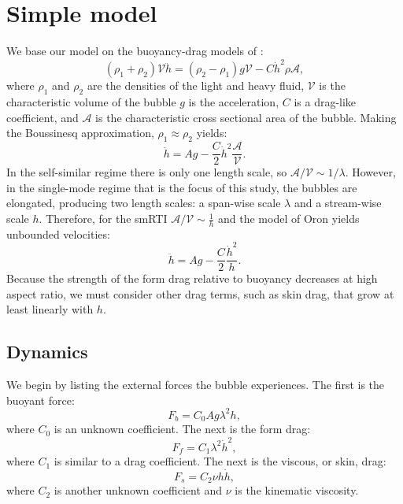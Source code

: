 \section{Simple model} 

We base our model on the buoyancy-drag models of \cite{Oron2001}:
\begin{equation}
(\rho_1 + \rho_2) \mathcal{V} \ddot{h} = (\rho_2 - \rho_1) g \mathcal{V} - C \dot{h}^2 \rho \mathcal{A},
\end{equation}
where $\rho_1$ and $\rho_2$ are the densities of the light and heavy fluid,
$\mathcal{V}$ is the characteristic volume of the bubble
$g$ is the acceleration,
$C$ is a drag-like coefficient, and
$\mathcal{A}$ is the characteristic cross sectional area of the bubble.
Making the Boussinesq approximation, $\rho_1 \approx \rho_2$ yields:
\begin{equation}
\ddot{h} = A g - \frac{C}{2} \dot{h}^2 \frac{\mathcal{A}}{\mathcal{V}}.
\end{equation}
In the self-similar regime there is only one length scale, so $\mathcal{A}/\mathcal{V} \sim 1 / \lambda$.
However, in the single-mode regime that is the focus of this study, the bubbles are elongated, producing two length scales: a span-wise scale $\lambda$ and a stream-wise scale $h$.
Therefore, for the smRTI $\mathcal{A}/\mathcal{V} \sim \frac{1}{h}$ and the model of Oron \etal yields unbounded velocities:
\begin{equation}
\ddot{h} = A g - \frac{C}{2} \frac{\dot{h}^2}{h}.
\end{equation}
Because the strength of the form drag relative to buoyancy decreases at high aspect ratio, we must consider other drag terms, such as skin drag, that grow at least linearly with $h$.

\subsection{Dynamics}

We begin by listing the external forces the bubble experiences.  The first is the buoyant force:
\begin{equation}
F_b = C_0 A g \lambda^2 h,
\end{equation}
where $C_0$ is an unknown coefficient.
The next is the form drag:
\begin{equation}
F_f = C_1 \lambda^2 \dot{h}^2,
\end{equation}
where $C_1$ is similar to a drag coefficient.
The next is the viscous, or skin, drag:
\begin{equation}
F_s = C_2 \nu h \dot{h},
\end{equation}
where $C_2$ is another unknown coefficient and 
$\nu$ is the kinematic viscosity.


